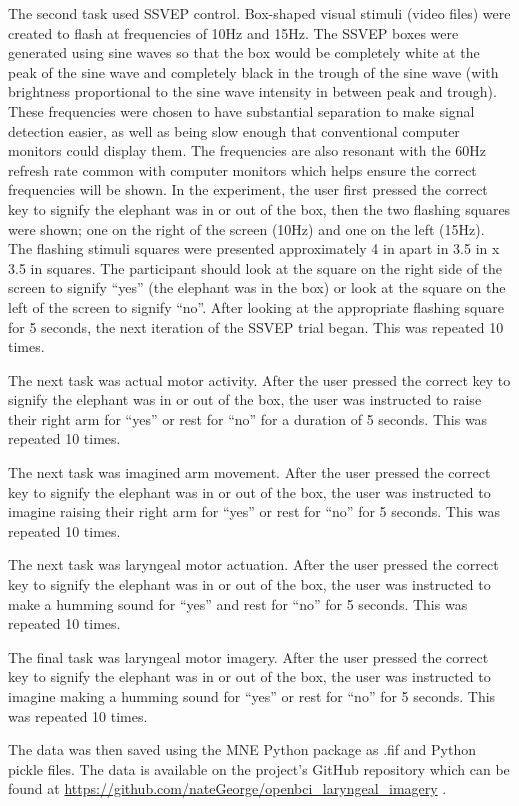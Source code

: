 \documentclass{article}
\begin{document}
The second task used SSVEP control. Box-shaped visual stimuli (video files) were created to flash at frequencies of 10Hz and 15Hz. The SSVEP boxes were generated using sine waves so that the box would be completely white at the peak of the sine wave and completely black in the trough of the sine wave (with brightness proportional to the sine wave intensity in between peak and trough). These frequencies were chosen to have substantial separation to make signal detection easier, as well as being slow enough that conventional computer monitors could display them. The frequencies are also resonant with the 60Hz refresh rate common with computer monitors which helps ensure the correct frequencies will be shown. In the experiment, the user first pressed the correct key to signify the elephant was in or out of the box, then the two flashing squares were shown; one on the right of the screen (10Hz) and one on the left (15Hz). The flashing stimuli squares were presented approximately 4 in apart in 3.5 in x 3.5 in squares. The participant should look at the square on the right side of the screen to signify “yes” (the elephant was in the box) or look at the square on the left of the screen to signify “no”. After looking at the appropriate flashing square for 5 seconds, the next iteration of the SSVEP trial began. This was repeated 10 times.

The next task was actual motor activity. After the user pressed the correct key to signify the elephant was in or out of the box, the user was instructed to raise their right arm for “yes” or rest for “no” for a duration of 5 seconds. This was repeated 10 times. 

The next task was imagined arm movement. After the user pressed the correct key to signify the elephant was in or out of the box, the user was instructed to imagine raising their right arm for “yes” or rest for “no” for 5 seconds. This was repeated 10 times.

The next task was laryngeal motor actuation. After the user pressed the correct key to signify the elephant was in or out of the box, the user was instructed to make a humming sound for “yes” and rest for “no” for 5 seconds. This was repeated 10 times. 

The final task was laryngeal motor imagery. After the user pressed the correct key to signify the elephant was in or out of the box, the user was instructed to imagine making a humming sound for “yes” or rest for “no” for 5 seconds. This was repeated 10 times.

The data was then saved using the MNE Python package as .fif and Python pickle files. The data is available on the project's GitHub repository which can be found at  \href{Github}{https://github.com/nateGeorge/openbci\_laryngeal\_imagery} \citep{george_nategeorgeopenbci_laryngeal_imagery_2021}.
\end{document}

